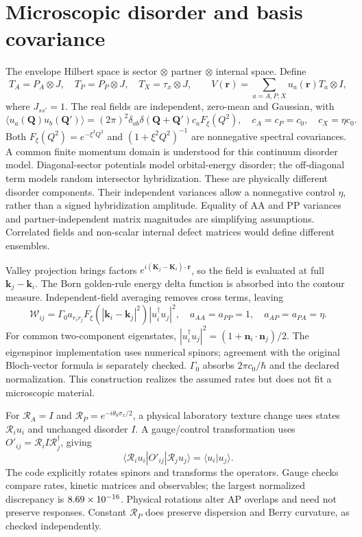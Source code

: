 \documentclass[11pt]{article}
\begin{document}
\section{Microscopic disorder and basis covariance}
The envelope Hilbert space is sector $\otimes$ partner $\otimes$ internal space. Define
\begin{equation}
T_A=P_A\otimes J,\quad T_P=P_P\otimes J,\quad T_X=\tau_x\otimes J,
\qquad V(\bm r)=\sum_{a=A,P,X}u_a(\bm r)T_a\otimes I,
\end{equation}
where $J_{ss'}=1$. The real fields are independent, zero-mean and Gaussian, with
\begin{equation}
\langle u_a(\bm Q)u_b(\bm Q')\rangle
=(2\pi)^2\delta_{ab}\delta(\bm Q+\bm Q')c_aF_\xi(Q^2),
\quad c_A=c_P=c_0,\quad c_X=\eta c_0.\label{eq:covariance}
\end{equation}
Both $F_\xi(Q^2)=e^{-\xi^2Q^2}$ and $(1+\xi^2Q^2)^{-1}$ are nonnegative spectral covariances. A common finite momentum domain is understood for this continuum disorder model. Diagonal-sector potentials model orbital-energy disorder; the off-diagonal term models random intersector hybridization. These are physically different disorder components. Their independent variances allow a nonnegative control $\eta$, rather than a signed hybridization amplitude. Equality of AA and PP variances and partner-independent matrix magnitudes are simplifying assumptions. Correlated fields and non-scalar internal defect matrices would define different ensembles.

Valley projection brings factors $e^{i(\bm K_j-\bm K_i)\cdot\bm r}$, so the field is evaluated at full $\bm k_j-\bm k_i$. The Born golden-rule energy delta function is absorbed into the contour measure. Independent-field averaging removes cross terms, leaving
\begin{equation}
\mathcal W_{ij}=\Gamma_0a_{r_ir_j}F_\xi(|\bm k_i-\bm k_j|^2)|u_i^\dagger u_j|^2,
\quad a_{AA}=a_{PP}=1,\quad a_{AP}=a_{PA}=\eta.
\end{equation}
For common two-component eigenstates, $|u_i^\dagger u_j|^2=(1+\bm n_i\cdot\bm n_j)/2$. The eigenspinor implementation uses numerical spinors; agreement with the original Bloch-vector formula is separately checked. $\Gamma_0$ absorbs $2\pi c_0/\hbar$ and the declared normalization. This construction realizes the assumed rates but does not fit a microscopic material.

For $\mathcal R_A=I$ and $\mathcal R_P=e^{-i\theta_0\sigma_x/2}$, a physical laboratory texture change uses states $\mathcal R_i u_i$ and unchanged disorder $I$. A gauge/control transformation uses $O'_{ij}=\mathcal R_i I \mathcal R_j^\dagger$, giving
\begin{equation}
\langle \mathcal R_i u_i|O'_{ij}|\mathcal R_j u_j\rangle=\langle u_i|u_j\rangle.
\end{equation}
The code explicitly rotates spinors and transforms the operators. Gauge checks compare rates, kinetic matrices and observables; the largest normalized discrepancy is $8.69\times10^{-16}$. Physical rotations alter AP overlaps and need not preserve responses. Constant $\mathcal R_P$ does preserve dispersion and Berry curvature, as checked independently.
\end{document}
